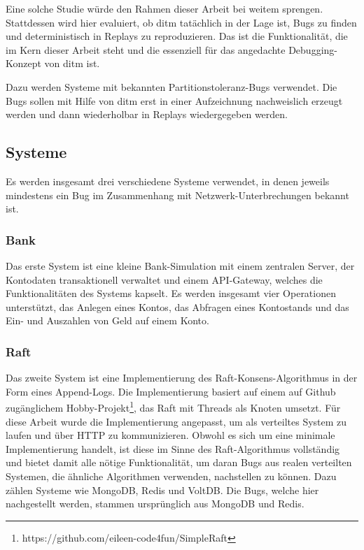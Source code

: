 \documentclass[12pt,a4paper]{report}
\begin{document}
Eine solche Studie würde den Rahmen dieser Arbeit bei weitem sprengen. Stattdessen wird hier evaluiert, ob ditm tatächlich in der
Lage ist, Bugs zu finden und deterministisch in Replays zu reproduzieren. Das ist die Funktionalität, die im Kern dieser Arbeit steht
und die essenziell für das angedachte Debugging-Konzept von ditm ist.

Dazu werden Systeme mit bekannten Partitionstoleranz-Bugs verwendet. Die Bugs sollen mit Hilfe von ditm erst in einer Aufzeichnung
nachweislich erzeugt werden und dann wiederholbar in Replays wiedergegeben werden.

\subsection{Systeme}
Es werden insgesamt drei verschiedene Systeme verwendet, in denen jeweils mindestens ein Bug im Zusammenhang mit
Netzwerk-Unterbrechungen bekannt ist.

\subsubsection{Bank}
Das erste System ist eine kleine Bank-Simulation mit einem zentralen Server, der Kontodaten transaktionell verwaltet und einem
API-Gateway, welches die Funktionalitäten des Systems kapselt. Es werden insgesamt vier Operationen unterstützt, das Anlegen eines
Kontos, das Abfragen eines Kontostands und das Ein- und Auszahlen von Geld auf einem Konto.

\subsubsection{Raft}
\label{chap:raft}
Das zweite System ist eine Implementierung des Raft-Konsens-Algorithmus in der Form eines Append-Logs. Die Implementierung basiert
auf einem auf Github zugänglichem Hobby-Projekt\footnote{https://github.com/eileen-code4fun/SimpleRaft}, das Raft mit Threads als
Knoten umsetzt. Für diese Arbeit wurde die Implementierung angepasst, um als verteiltes System zu laufen und über HTTP zu
kommunizieren. Obwohl es sich um eine minimale Implementierung handelt, ist diese im Sinne des Raft-Algorithmus vollständig und
bietet damit alle nötige Funktionalität, um daran Bugs aus realen verteilten Systemen, die ähnliche Algorithmen verwenden,
nachstellen zu können. Dazu zählen Systeme wie MongoDB, Redis und VoltDB. Die Bugs, welche hier nachgestellt werden, stammen
ursprünglich aus MongoDB und Redis.
\end{document}
